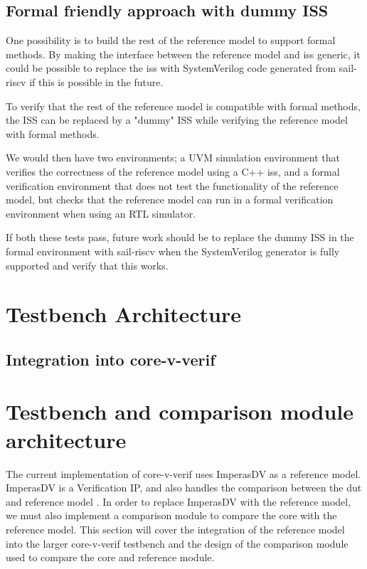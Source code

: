 \subsection{Formal friendly approach with dummy ISS}

One possibility is to build the rest of the reference model to support formal methods. By making the interface between the reference model and \acrshort{iss} generic, it could be possible to replace the \acrshort{iss} with SystemVerilog code generated from sail-riscv if this is possible in the future.


To verify that the rest of the reference model is compatible with formal methods, the ISS can be replaced by a "dummy" ISS while verifying the reference model with formal methods. 


We would then have two environments; a UVM simulation environment that verifies the correctness of the reference model using a C++ \acrshort{iss}, and a formal verification environment that does not test the functionality of the reference model, but checks that the reference model can run in a formal verification environment when using an RTL simulator.

If both these tests pass, future work should be to replace the dummy ISS in the formal environment with sail-riscv when the SystemVerilog generator is fully supported and verify that this works. 



\section{Testbench Architecture}
\subsection{Integration into core-v-verif}



\section{Testbench and comparison module architecture}

The current implementation of core-v-verif uses ImperasDV as a reference model. ImperasDV is a Verification IP, and also handles the comparison between the \acrshort{dut} and reference model \cite{imperassoftwareltdRISCVProcessorOVP2023}. In order to replace ImperasDV with the reference model, we must also implement a comparison module to compare the core with the reference model. This section will cover the integration of the reference model into the larger \gls{core-v-verif} testbench and the design of the comparison module used to compare the core and reference module.

